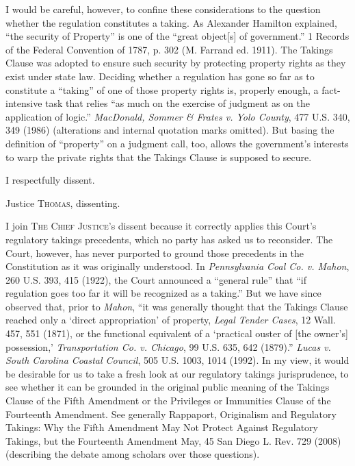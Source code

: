 I would be careful, however, to confine these considerations to the question
whether the regulation constitutes a taking. As Alexander Hamilton explained,
``the security of Property'' is one of the ``great object[s] of government.'' 1
Records of the Federal Convention of 1787, p. 302 (M. Farrand ed. 1911). The
Takings Clause was adopted to ensure such security by protecting property rights
as they exist under state law. Deciding whether a regulation has gone so far as
to constitute a ``taking'' of one of those property rights is, properly enough,
a fact-intensive task that relies ``as much on the exercise of judgment as on
the application of logic.'' \textit{MacDonald, Sommer \& Frates v. Yolo County},
477 U.S. 340, 349 (1986) (alterations and internal quotation marks omitted). But
basing the definition of ``property'' on a judgment call, too, allows the
government's interests to warp the private rights that the Takings Clause is
supposed to secure.

I respectfully dissent.

\opinion Justice \textsc{Thomas}, dissenting.

I join \textsc{The Chief Justice}'s dissent because it correctly applies this
Court's regulatory takings precedents, which no party has asked us to
reconsider. The Court, however, has never purported to ground those precedents
in the Constitution as it was originally understood. In \textit{Pennsylvania
Coal Co. v. Mahon}, 260 U.S. 393, 415 (1922), the Court announced a ``general
rule'' that ``if regulation goes too far it will be recognized as a taking.''
But we have since observed that, prior to \textit{Mahon}, ``it was generally
thought that the Takings Clause reached only a `direct appropriation' of
property, \textit{Legal Tender Cases}, 12 Wall. 457, 551 (1871), or the
functional equivalent of a `practical ouster of [the owner's] possession,'
\textit{Transportation Co. v. Chicago}, 99 U.S. 635, 642 (1879).'' \textit{Lucas
v. South Carolina Coastal Council}, 505 U.S. 1003, 1014 (1992). In my view, it
would be desirable for us to take a fresh look at our regulatory takings
jurisprudence, to see whether it can be grounded in the original public meaning
of the Takings Clause of the Fifth Amendment or the Privileges or Immunities
Clause of the Fourteenth Amendment. See generally Rappaport, Originalism and
Regulatory Takings: Why the Fifth Amendment May Not Protect Against Regulatory
Takings, but the Fourteenth Amendment May, 45 San Diego L. Rev. 729 (2008)
(describing the debate among scholars over those questions).

